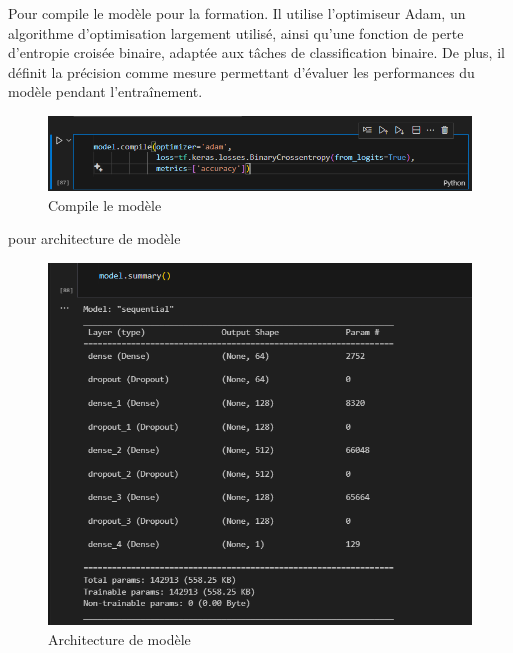 \documentclass[a4paper,12pt]{report}
\begin{document}
\noindent \normalsize Pour compile le modèle pour la formation. Il utilise l'optimiseur Adam, un algorithme d'optimisation largement utilisé, ainsi qu'une fonction de perte d'entropie croisée binaire, adaptée aux tâches de classification binaire. De plus, il définit la précision comme mesure permettant d'évaluer les performances du modèle pendant l'entraînement.
\begin{figure}[H]
\centering
 \includegraphics[scale=0.9]{outils-images/data22.png}
\caption{Compile le modèle}
\end{figure}
pour architecture de modèle
\begin{figure}[H]
\centering
 \includegraphics[scale=0.9]{outils-images/data23.png}
\caption{Architecture de modèle}
\end{figure}
\end{document}
